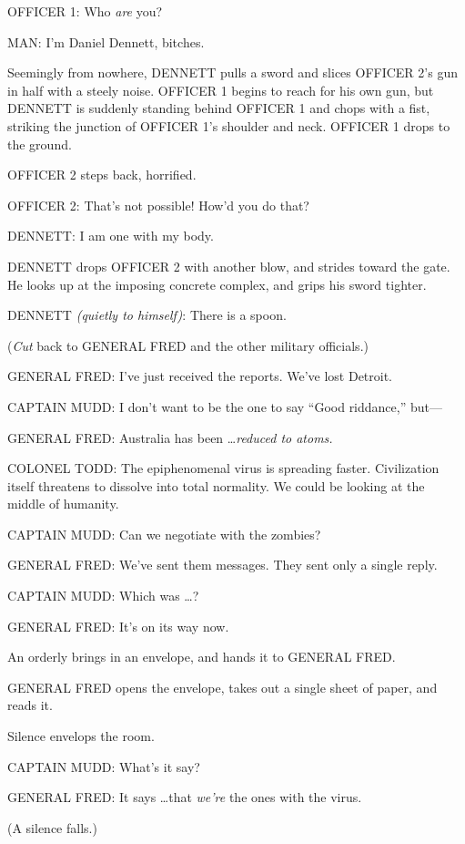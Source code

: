 {
 OFFICER 1: Who \textit{are} you?}

{
 MAN: I'm Daniel Dennett, bitches.}

{
 Seemingly from nowhere, DENNETT pulls a sword and slices OFFICER
2's gun in half with a steely noise. OFFICER 1 begins
to reach for his own gun, but DENNETT is suddenly standing behind
OFFICER 1 and chops with a fist, striking the junction of OFFICER
1's shoulder and neck. OFFICER 1 drops to the ground.}

{
 OFFICER 2 steps back, horrified.}

{
 OFFICER 2: That's not possible!
How'd you do that?}

{
 DENNETT: I am one with my body.}

{
 DENNETT drops OFFICER 2 with another blow, and strides toward the
gate. He looks up at the imposing concrete complex, and grips his sword
tighter.}

{
 DENNETT \textit{(quietly to himself)}: There is a spoon.}

{
 (\textit{Cut} back to GENERAL FRED and the other military
officials.)}

{
 GENERAL FRED: I've just received the reports.
We've lost Detroit.}

{
 CAPTAIN MUDD: I don't want to be the one to say
``Good riddance,'' but---}

{
 GENERAL FRED: Australia has been \ldots \textit{reduced to atoms.}}

{
 COLONEL TODD: The epiphenomenal virus is spreading faster.
Civilization itself threatens to dissolve into total normality. We
could be looking at the middle of humanity.}

{
 CAPTAIN MUDD: Can we negotiate with the zombies?}

{
 GENERAL FRED: We've sent them messages. They sent
only a single reply.}

{
 CAPTAIN MUDD: Which was \ldots ?}

{
 GENERAL FRED: It's on its way now.}

{
 An orderly brings in an envelope, and hands it to GENERAL FRED.}

{
 GENERAL FRED opens the envelope, takes out a single sheet of
paper, and reads it.}

{
 Silence envelops the room.}

{
 CAPTAIN MUDD: What's it say?}

{
 GENERAL FRED: It says \ldots that \textit{we're}
the ones with the virus.}

{
 (A silence falls.)}

